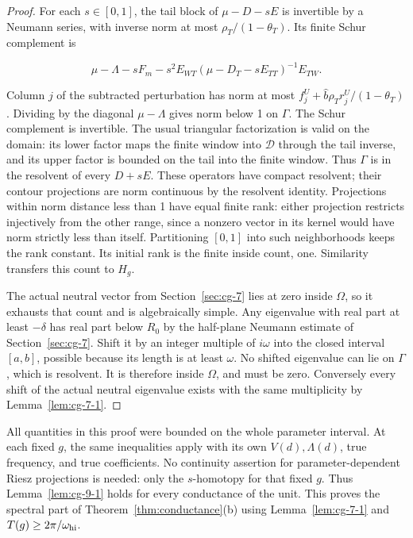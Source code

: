 \documentclass[11pt]{article}
\theoremstyle{definition}
\begin{document}
\begin{proof} For each $s\in[0,1]$, the tail block of $\mu-D-sE$ is invertible by a Neumann series, with inverse norm at most $\rho_T/(1-\theta_T)$. Its finite Schur complement is

\[
 \mu-\Lambda-sF_m-s^2E_{WT}(\mu-D_T-sE_{TT})^{-1}E_{TW}.
\]

Column $j$ of the subtracted perturbation has norm at most $f_j^U+\widehat b\rho_Tr_j^U/(1-\theta_T)$. Dividing by the diagonal $\mu-\Lambda$ gives norm below 1 on $\Gamma$. The Schur complement is invertible. The usual triangular factorization is valid on the domain: its lower factor maps the finite window into $\mathcal D$ through the tail inverse, and its upper factor is bounded on the tail into the finite window. Thus $\Gamma$ is in the resolvent of every $D+sE$. These operators have compact resolvent; their contour projections are norm continuous by the resolvent identity. Projections within norm distance less than 1 have equal finite rank: either projection restricts injectively from the other range, since a nonzero vector in its kernel would have norm strictly less than itself. Partitioning $[0,1]$ into such neighborhoods keeps the rank constant. Its initial rank is the finite inside count, one. Similarity transfers this count to $H_g$.

The actual neutral vector from Section~\ref{sec:cg-7} lies at zero inside $\Omega$, so it exhausts that count and is algebraically simple. Any eigenvalue with real part at least $-\delta$ has real part below $R_0$ by the half-plane Neumann estimate of Section~\ref{sec:cg-7}. Shift it by an integer multiple of $i\omega$ into the closed interval $[a,b]$, possible because its length is at least $\omega$. No shifted eigenvalue can lie on $\Gamma$, which is resolvent. It is therefore inside $\Omega$, and must be zero. Conversely every shift of the actual neutral eigenvalue exists with the same multiplicity by Lemma~\ref{lem:cg-7-1}. \end{proof}

All quantities in this proof were bounded on the whole parameter interval. At each fixed $g$, the same inequalities apply with its own $V(d),\Lambda(d)$, true frequency, and true coefficients. No continuity assertion for parameter-dependent Riesz projections is needed: only the $s$-homotopy for that fixed $g$. Thus Lemma~\ref{lem:cg-9-1} holds for every conductance of the unit. This proves the spectral part of Theorem~\ref{thm:conductance}(b) using Lemma~\ref{lem:cg-7-1} and $T(g)\ge2\pi/\omega_{\rm hi}$.
\end{document}
